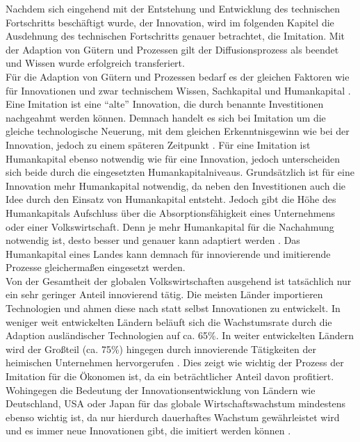 Nachdem sich eingehend mit der Entstehung und Entwicklung des technischen Fortschritts beschäftigt wurde, der Innovation, wird im folgenden Kapitel die Ausdehnung des technischen Fortschritts genauer betrachtet, die Imitation. Mit der Adaption von Gütern und Prozessen gilt der Diffusionsprozess als beendet und Wissen wurde erfolgreich transferiert. \\
Für die Adaption von Gütern und Prozessen bedarf es der gleichen Faktoren wie für Innovationen und zwar technischem Wissen, Sachkapital und Humankapital \citep{Cohen.1989,Griffith.2004}. Eine Imitation ist eine "`alte"' Innovation, die durch benannte Investitionen nachgeahmt werden können. Demnach handelt es sich bei Imitation um die gleiche technologische Neuerung, mit dem gleichen Erkenntnisgewinn wie bei der Innovation, jedoch zu einem sp{\"a}teren Zeitpunkt \citep{Schmookler.1966}. Für eine Imitation ist Humankapital ebenso notwendig wie für eine Innovation, jedoch unterscheiden sich beide durch die eingesetzten Humankapitalniveaus. Grundsätzlich ist für eine Innovation mehr Humankapital notwendig, da neben den Investitionen auch die Idee durch den Einsatz von Humankapital entsteht. Jedoch gibt die H{\"o}he des Humankapitals Aufschluss über die Absorptionsf{\"a}higkeit eines Unternehmens oder einer Volkswirtschaft. Denn je mehr Humankapital für die Nachahmung notwendig ist, desto besser und genauer kann adaptiert werden \citep{Nelson.1966}. Das Humankapital eines Landes kann demnach für innovierende und imitierende Prozesse gleicherma{\ss}en eingesetzt werden. \\
Von der Gesamtheit der globalen Volkswirtschaften ausgehend ist tatsächlich nur ein sehr geringer Anteil innovierend tätig. Die meisten L{\"a}nder importieren Technologien und ahmen diese nach statt selbst Innovationen zu entwickelt. In weniger weit entwickelten L{\"a}ndern beläuft sich die Wachstumsrate durch die Adaption ausl{\"a}ndischer Technologien auf ca. 65{\%}. In weiter entwickelten L{\"a}ndern wird der Gro{\ss}teil (ca. 75{\%}) hingegen durch innovierende T{\"a}tigkeiten der heimischen Unternehmen hervorgerufen \citep{Santacreu.2015}. Dies zeigt wie wichtig der Prozess der Imitation f{\"u}r die {\"O}konomen ist, da ein betr{\"a}chtlicher Anteil davon profitiert. Wohingegen die Bedeutung der Innovationsentwicklung von L{\"a}ndern wie Deutschland, USA oder Japan f{\"u}r das globale Wirtschaftswachstum mindestens ebenso wichtig ist, da nur hierdurch  dauerhaftes Wachstum gew{\"a}hrleistet wird und es immer neue Innovationen gibt, die imitiert werden können \citep{Acemoglu.2009}.\\


